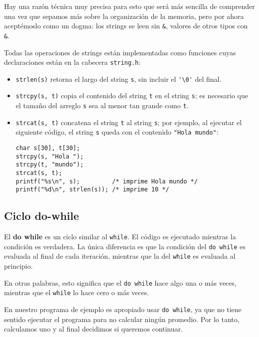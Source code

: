 Hay una razón técnica muy precisa para esto que será más sencilla de
comprender una vez que sepamos más sobre la organización de la memoria,
pero por ahora aceptémoslo como un dogma: los strings se leen sin
\lstinline!&!, valores de otros tipos con \lstinline!&!.

Todas las operaciones de strings están implementadas como funciones
cuyas declaraciones están en la cabecera \lstinline!string.h!:

\begin{itemize}
\item
  \lstinline!strlen(s)! retorna el largo del string \lstinline!s!, sin
  incluir el \lstinline!'\0'! del final.
\item
  \lstinline!strcpy(s, t)! copia el contenido del string \lstinline!t!
  en el string \lstinline!s!; es necesario que el tamaño del arreglo
  \lstinline!s! sea al menor tan grande como \lstinline!t!.
\item
  \lstinline!strcat(s, t)! concatena el string \lstinline!t! al string
  \lstinline!s!; por ejemplo, al ejecutar el siguiente código, el string
  \lstinline!s! queda con el contenido \lstinline!"Hola mundo"!:

\begin{lstlisting}
char s[30], t[30];
strcpy(s, "Hola ");
strcpy(t, "mundo");
strcat(s, t);
printf("%s\n", s);         /* imprime Hola mundo */
printf("%d\n", strlen(s)); /* imprime 10 */
\end{lstlisting}
\end{itemize}

\subsection{Ciclo do-while}

El \textbf{do while} es un ciclo similar al \lstinline!while!. El código
es ejecutado mientras la condición es verdadera. La única diferencia es
que la condición del \lstinline!do while! es evaluada al final de cada
iteración, mientras que la del \lstinline!while! es evaluada al
principio.

En otras palabras, esto significa que el \lstinline!do while! hace algo
una o más veces, mientras que el \lstinline!while! lo hace cero o más
veces.

En nuestro programa de ejemplo es apropiado usar \lstinline!do while!,
ya que no tiene sentido ejecutar el programa para no calcular ningún
promedio. Por lo tanto, calculamos uno y al final decidimos si queremos
continuar.

